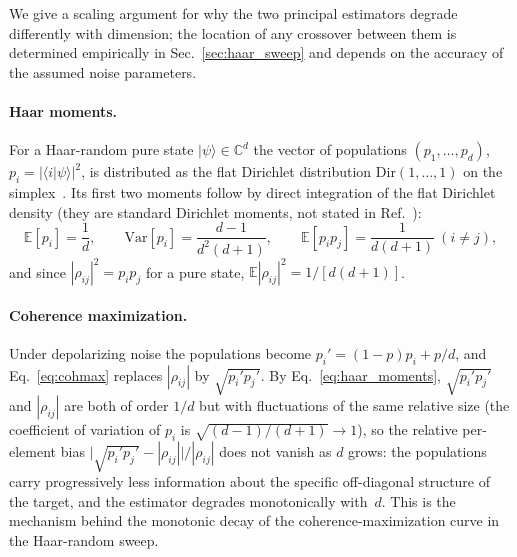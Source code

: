 \documentclass[12pt,a4paper]{article}
\begin{document}
We give a scaling argument for why the two principal estimators degrade differently with dimension; the location of any crossover between them is determined empirically in Sec.~\ref{sec:haar_sweep} and depends on the accuracy of the assumed noise parameters.

\paragraph{Haar moments.}
For a Haar-random pure state $|\psi\rangle \in \mathbb{C}^d$ the vector of populations $(p_1,\dots,p_d)$, $p_i = |\langle i|\psi\rangle|^2$, is distributed as the flat Dirichlet distribution $\mathrm{Dir}(1,\dots,1)$ on the simplex~\cite[Sec.~II.C, Eqs.~(2.8)--(2.9), and App.~A]{ZyczkowskiSommers2001}.
Its first two moments follow by direct integration of the flat Dirichlet density (they are standard Dirichlet moments, not stated in Ref.~\cite{ZyczkowskiSommers2001}):
\begin{equation}
\mathbb{E}[p_i] = \frac1d,\qquad
\mathrm{Var}[p_i] = \frac{d-1}{d^2(d+1)},\qquad
\mathbb{E}[p_i p_j] = \frac{1}{d(d+1)}\ (i \neq j),
\label{eq:haar_moments}
\end{equation}
and since $|\rho_{ij}|^2 = p_i p_j$ for a pure state, $\mathbb{E}|\rho_{ij}|^2 = 1/[d(d+1)]$.

\paragraph{Coherence maximization.}
Under depolarizing noise the populations become $p_i' = (1-p)p_i + p/d$, and Eq.~\eqref{eq:cohmax} replaces $|\rho_{ij}|$ by $\sqrt{p_i'p_j'}$.
By Eq.~\eqref{eq:haar_moments}, $\sqrt{p_i'p_j'}$ and $|\rho_{ij}|$ are both of order $1/d$ but with fluctuations of the same relative size (the coefficient of variation of $p_i$ is $\sqrt{(d-1)/(d+1)} \to 1$), so the relative per-element bias $\bigl|\sqrt{p_i'p_j'} - |\rho_{ij}|\bigr|/|\rho_{ij}|$ does not vanish as $d$ grows: the populations carry progressively less information about the specific off-diagonal structure of the target, and the estimator degrades monotonically with~$d$.
This is the mechanism behind the monotonic decay of the coherence-maximization curve in the Haar-random sweep.
\end{document}
